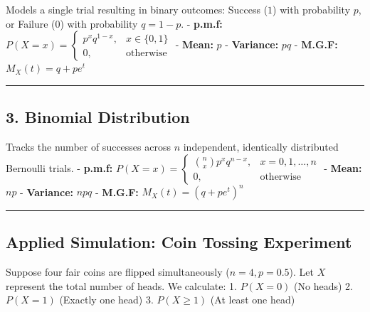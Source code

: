 \documentclass[
]{article}
\begin{document}
Models a single trial resulting in binary outcomes: Success (\(1\)) with
probability \(p\), or Failure (\(0\)) with probability \(q = 1-p\). -
\textbf{p.m.f:}
\(P(X=x) = \begin{cases} p^x q^{1-x}, & x \in \{0, 1\} \\ 0, & \text{otherwise} \end{cases}\)
- \textbf{Mean:} \(p\) - \textbf{Variance:} \(pq\) - \textbf{M.G.F:}
\(M_X(t) = q + pe^t\)

\begin{center}\rule{0.5\linewidth}{0.5pt}\end{center}

\subsection{3. Binomial Distribution}\label{binomial-distribution}

Tracks the number of successes across \(n\) independent, identically
distributed Bernoulli trials. - \textbf{p.m.f:}
\(P(X=x) = \begin{cases} \binom{n}{x} p^x q^{n-x}, & x = 0, 1, \dots, n \\ 0, & \text{otherwise} \end{cases}\)
- \textbf{Mean:} \(np\) - \textbf{Variance:} \(npq\) - \textbf{M.G.F:}
\(M_X(t) = (q + pe^t)^n\)

\begin{center}\rule{0.5\linewidth}{0.5pt}\end{center}

\subsection{Applied Simulation: Coin Tossing
Experiment}\label{applied-simulation-coin-tossing-experiment}

Suppose four fair coins are flipped simultaneously (\(n = 4, p = 0.5\)).
Let \(X\) represent the total number of heads. We calculate: 1.
\(P(X = 0)\) (No heads) 2. \(P(X = 1)\) (Exactly one head) 3.
\(P(X \ge 1)\) (At least one head)
\end{document}
